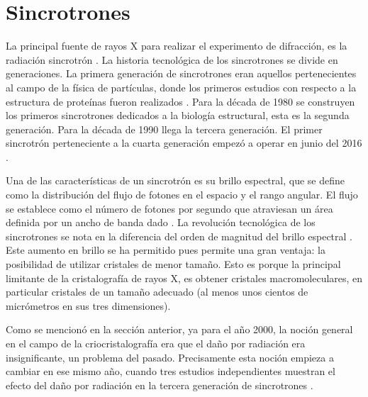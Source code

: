 \section{Sincrotrones}
La principal fuente de rayos X para realizar el experimento de difracción, es la radiación sincrotrón .
La historia tecnológica de los sincrotrones se divide en generaciones. La primera generación de sincrotrones eran aquellos pertenecientes al campo de la física de partículas, donde los primeros estudios con respecto a la estructura de proteínas fueron realizados . Para la década de 1980 se construyen los primeros sincrotrones dedicados a la biología estructural, esta es la segunda generación. Para la década de 1990 llega la tercera generación. El primer sincrotrón perteneciente a la cuarta generación empezó a operar en junio del 2016 . 

Una de las características de un sincrotrón es su brillo espectral, que se define como la distribución del flujo de fotones en el espacio y el rango angular. El flujo se establece como el número de fotones por segundo que atraviesan un área definida por un ancho de banda dado . La revolución tecnológica de los sincrotrones se nota en la diferencia del orden de magnitud del brillo espectral \cite{Willmott2019}. Este aumento en brillo se ha permitido pues permite una gran ventaja: la posibilidad de utilizar cristales de menor tamaño. Esto es porque la principal limitante de la cristalografía de rayos X, es obtener cristales macromoleculares, en particular cristales de un tamaño adecuado (al menos unos cientos de micrómetros en sus tres dimensiones). 


Como se mencionó en la sección anterior, ya para el año 2000, la noción general en el campo de la criocristalografía era que el daño por radiación era insignificante, un problema del pasado. Precisamente esta noción empieza a cambiar en ese mismo año, cuando tres estudios independientes muestran el efecto del daño por radiación en la tercera generación de sincrotrones . 

